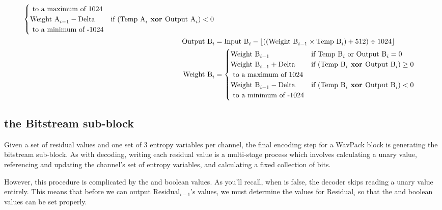 \begin{align*}
\begin{cases}
\text{ to a maximum of 1024} \\
\text{Weight A}_{i - 1} - \text{Delta} & \text{if } (\text{Temp A}_i \textbf{ xor } \text{Output A}_i) < 0 \\
\text{ to a minimum of -1024}
\end{cases} \\
\text{Output B}_i &= \text{Input B}_i - \lfloor((\text{Weight B}_{i - 1} \times \text{Temp B}_i) + 512) \div 1024\rfloor \\
\text{Weight B}_i &=
\begin{cases}
\text{Weight B}_{i - 1} & \text{if } \text{Temp B}_i \text{ or } \text{Output B}_i = 0 \\
\text{Weight B}_{i - 1} + \text{Delta} & \text{if } (\text{Temp B}_i \textbf{ xor } \text{Output B}_i) \geq 0 \\
\text{ to a maximum of 1024} \\
\text{Weight B}_{i - 1} - \text{Delta} & \text{if } (\text{Temp B}_i \textbf{ xor } \text{Output B}_i) < 0 \\
\text{ to a minimum of -1024}
\end{cases}
\end{align*}

\clearpage

\subsection{the Bitstream sub-block}

Given a set of residual values and one set of 3 entropy variables per
channel, the final encoding step for a WavPack block is generating
the bitstream sub-block.
As with decoding, writing each residual value is a multi-stage
process which involves calculating a unary value,
referencing and updating the channel's set of entropy variables, and
calculating a fixed collection of bits.

However, this procedure is complicated by the 
and  boolean values.
As you'll recall, when  is false, the
decoder skips reading a unary value entirely.
This means that before we can output $\text{Residual}_{i - 1}$'s values,
we must determine the values for $\text{Residual}_i$
so that the  and  boolean
values can be set properly.

